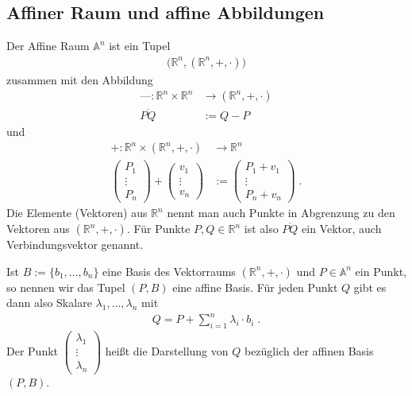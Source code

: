 \subsection{Affiner Raum und affine Abbildungen}
Der Affine Raum $\mathbb{A}^n$ ist ein Tupel
\begin{align*}
\bigl( \mathbb{R}^n, (\mathbb{R}^n, + , \cdot ) \bigr )
\end{align*}
zusammen mit den Abbildung 
\begin{align*}
\text{---} : \mathbb{R}^n \times \mathbb{R}^n  & \to (\mathbb{R}^n, + , \cdot ) \\
\overline{PQ} & := Q-P  
\end{align*}
und
\begin{align*}
+ : \mathbb{R}^n \times (\mathbb{R}^n, + , \cdot )   & \to  \mathbb{R}^n\\
\begin{pmatrix}
P_1 \\ \vdots \\ P_n
\end{pmatrix} + \begin{pmatrix}
v_1 \\ \vdots \\ v_n
\end{pmatrix} & := \begin{pmatrix}
P_1  + v_1 \\ \vdots \\ P_n + v_n 
\end{pmatrix}   \;.
\end{align*}
Die Elemente (Vektoren) aus $\mathbb{R}^n$ nennt man auch  Punkte in Abgrenzung zu den Vektoren aus $(\mathbb{R}^n, + , \cdot )$.  
Für Punkte $P,Q \in \mathbb{R}^n$ ist also $\overline{PQ}$ ein Vektor, auch Verbindungsvektor genannt.

\begin{Definition}
Ist $B:= \{b_1, \hdots , b_n \}$ eine Basis des Vektorraums  $(\mathbb{R}^n, + , \cdot )$ und $P \in \mathbb{A}^n$ ein Punkt, so nennen wir das Tupel
$(P, B)$ eine affine Basis. Für jeden Punkt $Q$ gibt es dann also Skalare $\lambda_1,\hdots ,\lambda_n$ mit 
\begin{align*}
Q = P + \sum_{i=1}^{n} \lambda_i \cdot b_i  \; .
\end{align*}
Der Punkt $\begin{pmatrix}  \lambda_1 \\  \vdots \\  \lambda_n \end{pmatrix}$ heißt die Darstellung von $Q$ bezüglich der affinen Basis $(P,B)$. 
\end{Definition}




